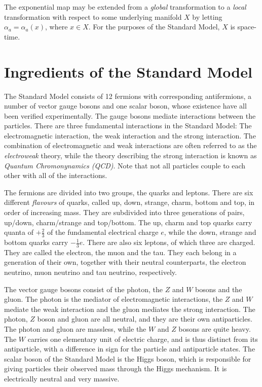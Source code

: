 \documentclass[twoside,english]{uiofysmaster}
\begin{document}
The exponential map may be extended from a {\it global} transformation to a {\it local} transformation with respect to some underlying manifold $X$ by letting $\alpha_a = \alpha_a(x)$, where $x\in X$. For the purposes of the Standard Model, $X$ is space-time.




\section{Ingredients of the Standard Model}

The Standard Model consists of 12 fermions with corresponding antifermions, a number of vector gauge bosons and one scalar boson, whose existence have all been verified experimentally. The gauge bosons mediate interactions between the particles. There are three fundamental interactions in the Standard Model: The electromagnetic interaction, the weak interaction and the strong interaction. The combination of electromagnetic and weak interactions are often referred to as the {\it electroweak} theory, while the theory describing the strong interaction is known as {\it Quantum Chromonynamics (QCD)}. Note that not all particles couple to each other with all of the interactions. 

The fermions are divided into two groups, the quarks and leptons. There are six different {\it flavours} of quarks, called up, down, strange, charm, bottom and top, in order of increasing mass. They are subdivided into three generations of pairs, up/down, charm/strange and top/bottom. The up, charm and top quarks carry quanta of $+\frac{2}{3}$ of the fundamental electrical charge $e$, while the down, strange and bottom quarks carry $-\frac{1}{3}e$. There are also six leptons, of which three are charged. They are called the electron, the muon and the tau. They each belong in a generation of their own, together with their neutral counterparts, the electron neutrino, muon neutrino and tau neutrino, respectively. 

The vector gauge bosons consist of the photon, the $Z$ and $W$ bosons and the gluon. The photon is the mediator of electromagnetic interactions, the $Z$ and $W$ mediate the weak interaction and the gluon mediates the strong interaction. The photon, $Z$ boson and gluon are all neutral, and they are their own antiparticles. The photon and gluon are massless, while the $W$ and $Z$ bosons are quite heavy. The $W$ carries one elementary unit of electric charge, and is thus distinct from its antiparticle, with a difference in sign for the particle and antiparticle states. The scalar boson of the Standard Model is the Higgs boson, which is responsible for giving particles their observed mass through the Higgs mechanism. It is electrically neutral and very massive.
\end{document}

